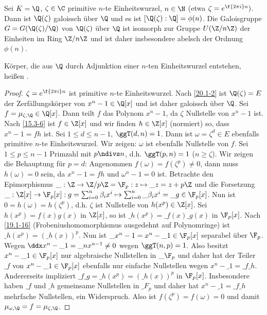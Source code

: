 \begin{st} \label{20.1-7}
	Sei $K = \Q$, $\zeta \in \C$ primitive $n$-te Einheitswurzel, $n \in \N$ (etwa $\zeta = e^{\f{2\pi i}n})$.
	Dann ist $\Q(\zeta)$ galoissch über $\Q$ und es ist $[\Q(\zeta) : \Q] = \phi(n)$.
	Die Galoisgruppe $G = G(\Q(\zeta) / \Q)$ von $\Q(\zeta)$ über $\Q$ ist isomorph zur Gruppe $U(\Z / n\Z)$ der Einheiten im Ring $\Z / n \Z$ und ist daher insbesondere abelsch der Ordnung $\phi(n)$.

	Körper, die aus $\Q$ durch Adjunktion einer $n$-ten Einheitswurzel entstehen, heißen .
	\begin{proof}
		$\zeta = e^{\f{2\pi i}n}$ ist primitive $n$-te Einheitswurzel.
		Nach \ref{20.1-2} ist $\Q(\zeta) = E$ der Zerfällungskörper von $x^n - 1 \in \Q[x]$ und ist daher galoissch über $\Q$.
		Sei $f = \mu_{\zeta,\Q} \in \Q[x]$.
		Dann teilt $f$ das Polynom $x^n - 1$, da $\zeta$ Nullstelle von $x^n - 1$ ist.
		Nach \ref{15.3-6} ist $f \in \Z[x]$ und wir finden $h \in \Z[x]$ (normiert) so, dass $x^n - 1 = fh$ ist.
		Sei $1 \le d \le n - 1$, $\ggT(d,n) = 1$.
		Dann ist $\omega = \zeta^d \in E$ ebenfalls primitive $n$-te Einheitswurzel.
		Wir zeigen: $\omega$ ist ebenfalls Nullstelle von $f$.
		Sei $1 \le p \le n - 1$ Primzahl mit $p \ndivs n$, d.h. $\ggT(p,n) = 1$ (\oBdA $n \ge \zeta$).
		Wir zeigen die Behauptung für $p = d$:
		Angenommen $f(\omega) = f(\zeta^p) \neq 0$, dann muss $h(\omega) = 0$ sein, da $x^n - 1 = fh$ und $\omega^n - 1 = 0$ ist.
		Betrachte den Epimorphismus $\_{} : \Z \to \Z / p \Z = \F_p : z \mapsto \_z = z + p \Z$ und die Forsetzung $\_{}: \Z[x] \to \F_p[x]: g = \sum_{i=0}^n \beta_i x^i \mapsto \sum_{i=0}^n \_{\beta_i} x^i = \_g \in \F_p[x]$.
		Nun ist $0 = h(\omega) = h(\zeta^p)$, d.h. $\zeta$ ist Nullstelle von $h(x^p) \in \Z[x]$.
		Sei $h(x^p) = f(x)g(x)$ in $\Z[x]$, so ist $\_h(x^p) = \_f(x)\_g(x)$ in $\F_p[x]$.
		Nach \ref{19.1-16} (Frobeniushomomorphismus ausgedehnt auf Polynomringe) ist $\_h(x^p) = (\_h(x))^p$.
		Nun ist $\_{x^n - 1} = x^n - \_1 \in \F_p[x]$ separabel über $\F_p$.
		Wegen $\ddx x^n - \_1 = \_n x^{n-1} \neq 0$ wegen $\ggT(n, p) = 1$.
		Also besitzt $x^n - \_1 \in \F_p[x]$ nur algebraische Nullstellen in $\_{\F_p}$ und daher hat der Teiler $\_f$ von $x^n - \_1 \in \F_p[x]$ ebenfalls nur einfache Nullstellen wegen $x^n - \_1 = \_f  \_h$.
		Andererseits impliziert $\_f \_g = \_h(x^p) = (\_h(x))^p$ in $\F_p[x]$.
		Insbesondere haben $\_f$ und $\_h$ gemeinsame Nullstellen in $\_F_p$ und daher hat $x^n - \_1 = \_f \_h$ mehrfache Nullstellen, ein Widerspruch.
		Also ist $f(\zeta^p) = f(\omega) = 0$ und damit $\mu_{\omega, \Q} = f = \mu_{\zeta, \Q}$.

\end{proof}
\end{st}

